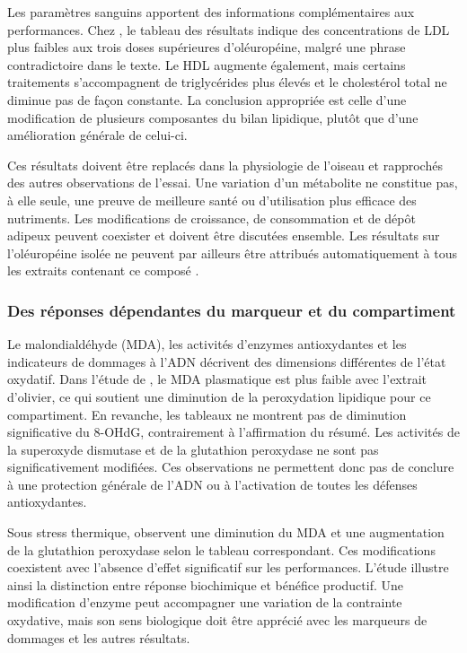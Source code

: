 Les paramètres sanguins apportent des informations complémentaires aux performances. Chez \citet{Erener2020}, le tableau des résultats indique des concentrations de LDL plus faibles aux trois doses supérieures d'oléuropéine, malgré une phrase contradictoire dans le texte. Le HDL augmente également, mais certains traitements s'accompagnent de triglycérides plus élevés et le cholestérol total ne diminue pas de façon constante. La conclusion appropriée est celle d'une modification de plusieurs composantes du bilan lipidique, plutôt que d'une amélioration générale de celui-ci.

Ces résultats doivent être replacés dans la physiologie de l'oiseau et rapprochés des autres observations de l'essai. Une variation d'un métabolite ne constitue pas, à elle seule, une preuve de meilleure santé ou d'utilisation plus efficace des nutriments. Les modifications de croissance, de consommation et de dépôt adipeux peuvent coexister et doivent être discutées ensemble. Les résultats sur l'oléuropéine isolée ne peuvent par ailleurs être attribués automatiquement à tous les extraits contenant ce composé \citep{Erener2020,Sulaiman2025}.

\subsubsection{Des réponses dépendantes du marqueur et du compartiment}

Le malondialdéhyde (MDA), les activités d'enzymes antioxydantes et les indicateurs de dommages à l'ADN décrivent des dimensions différentes de l'état oxydatif. Dans l'étude de \citet{Pirman2021}, le MDA plasmatique est plus faible avec l'extrait d'olivier, ce qui soutient une diminution de la peroxydation lipidique pour ce compartiment. En revanche, les tableaux ne montrent pas de diminution significative du 8-OHdG, contrairement à l'affirmation du résumé. Les activités de la superoxyde dismutase et de la glutathion peroxydase ne sont pas significativement modifiées. Ces observations ne permettent donc pas de conclure à une protection générale de l'ADN ou à l'activation de toutes les défenses antioxydantes.

Sous stress thermique, \citet{Agah2019} observent une diminution du MDA et une augmentation de la glutathion peroxydase selon le tableau correspondant. Ces modifications coexistent avec l'absence d'effet significatif sur les performances. L'étude illustre ainsi la distinction entre réponse biochimique et bénéfice productif. Une modification d'enzyme peut accompagner une variation de la contrainte oxydative, mais son sens biologique doit être apprécié avec les marqueurs de dommages et les autres résultats.

